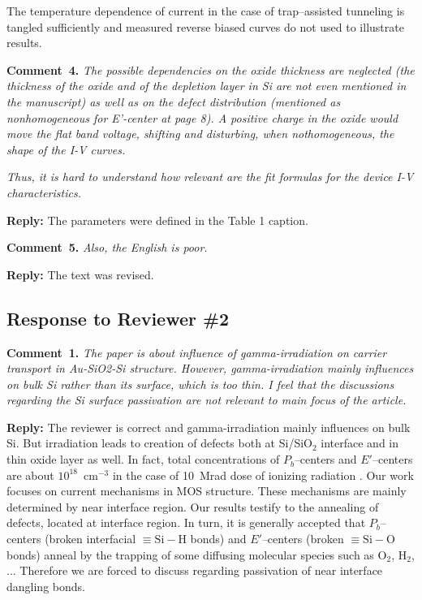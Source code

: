 \documentclass[aip,jap,preprint]{revtex4-1}
\begin{document}
The temperature dependence of current in the case of  trap--assisted tunneling is tangled sufficiently  \cite{TAT:Gilmore,TAT:GopalSST,TAT:Gopal} and 
measured reverse biased curves do not used to illustrate  results.


\noindent
\textcolor[rgb]{0.00,0.50,1.00}{\textbf{Comment~4.}}
\emph{The possible dependencies on the oxide thickness are neglected (the thickness of the oxide and of the depletion layer in Si are not even mentioned in the manuscript) as well as on the defect distribution (mentioned as nonhomogeneous for E’-center at page 8). A positive charge in the oxide would move the flat band voltage, shifting and disturbing, when nothomogeneous, the shape of the I-V curves.}

\emph{Thus, it is hard to understand how relevant are the fit formulas for the device I-V characteristics.}


\noindent
\textcolor[rgb]{0.51,0.00,0.00}{\textbf{Reply:}}
The parameters were defined in the Table 1 caption.




\noindent
\textcolor[rgb]{0.00,0.50,1.00}{\textbf{Comment~5.}}
\emph{Also, the English is poor.}


\noindent
\textcolor[rgb]{0.51,0.00,0.00}{\textbf{Reply:}}
The text was revised.


\subsection*{Response to Reviewer \#2 }

\noindent
\textcolor[rgb]{0.00,0.50,1.00}{\textbf{Comment~1.}}
\emph{ The paper is about influence of gamma-irradiation on carrier transport in Au-SiO2-Si structure. However, gamma-irradiation mainly influences on bulk Si rather than its surface, which is too thin. I feel that the discussions regarding the Si surface passivation are not relevant to main focus of the article.}

\noindent
\textcolor[rgb]{0.51,0.00,0.00}{\textbf{Reply:}}
The reviewer is correct and gamma-irradiation mainly influences on bulk Si.
But irradiation leads to creation of defects both at Si/SiO$_2$  interface and in thin oxide layer as well.
In fact, total concentrations of $P_b$--centers and $E'$--centers are about $10^{18}$~cm$^{-3}$
in the case of 10~Mrad dose of ionizing radiation \cite{Fleetwood,PersenkovBook}.
Our work focuses on current mechanisms in MOS structure.
These mechanisms are mainly determined by near interface region.
Our results testify to the annealing  of defects, located at interface region.
In turn, it  is generally accepted \cite{SiO2:Devine,SiO2:Mahapatra} that $P_b$--centers (broken interfacial $\equiv\!\mathrm{Si}\!-\!\mathrm{H}$ bonds) and $E'$--centers (broken $\equiv\!\mathrm{Si}\!-\!\mathrm{O}$ bonds) anneal by  the
trapping  of  some  diffusing molecular species  such as  $\text{O}_2$, $\text{H}_2$, ...
Therefore we are forced to discuss regarding passivation of near interface dangling bonds.
\end{document}
